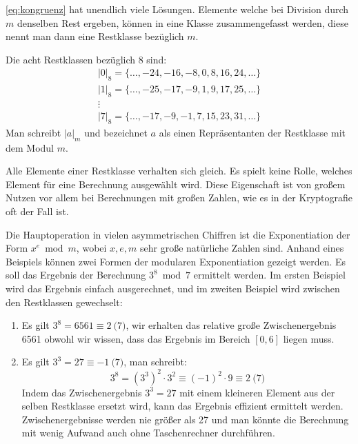 \noindent
\autoref{eq:kongruenz} hat unendlich viele Lösungen.
Elemente welche bei Division durch $m$ denselben Rest ergeben,
können in eine Klasse zusammengefasst werden, diese nennt man dann eine Restklasse bezüglich $m$.
\begin{example}
  Die acht Restklassen bezüglich 8 sind:
  \begin{gather*}
    \vert0\vert_8 = \{\dots,-24,-16,-8,0,8,16,24,\dots\}\\
    \vert1\vert_8 =\{\dots,-25,-17,-9,1,9,17,25,\dots\}\\
    \vdots\\
    \vert7\vert_8 =\{\dots,-17,-9,-1,7,15,23,31,\dots\}
  \end{gather*}
  Man schreibt $|a|_m$ und bezeichnet $a$ als einen
  Repräsentanten der Restklasse mit dem Modul $m$.
\end{example}

\noindent
Alle Elemente einer Restklasse verhalten sich gleich. Es spielt
keine Rolle, welches Element für eine Berechnung ausgewählt wird.
Diese Eigenschaft ist von großem Nutzen vor allem bei Berechnungen mit großen Zahlen,
wie es in der Kryptografie oft der Fall ist.

\begin{example}
  Die Hauptoperation in vielen asymmetrischen Chiffren ist die Exponentiation der Form
  $x^e \bmod{m}$, wobei $x,e,m$ sehr große natürliche Zahlen sind. Anhand eines Beispiels können
  zwei Formen der modularen Exponentiation gezeigt werden. Es soll das Ergebnis der
  Berechnung $3^8 \bmod{7}$ ermittelt werden. Im ersten Beispiel wird das Ergebnis einfach
  ausgerechnet, und im zweiten Beispiel wird zwischen den Restklassen gewechselt:
  \begin{enumerate}
    \item Es gilt $3^8 = 6561 \equiv 2 \pod{7}$, wir erhalten das relative
          große Zwischenergebnis 6561 obwohl wir wissen,
          dass das Ergebnis im Bereich $[0, 6]$ liegen muss.
    \item Es gilt $3^3 = 27 \equiv -1 \pod{7}$, man schreibt:
          \begin{equation*}
            3^8 = (3^3)^2 \cdot 3^2 \equiv (-1)^2 \cdot 9 \equiv 2 \pod{7}
          \end{equation*}
          Indem das Zwischenergebnis $3^3 = 27$ mit einem kleineren Element aus der selben
          Restklasse ersetzt wird, kann das Ergebnis effizient ermittelt werden. Zwischenergebnisse
          werden nie größer als 27 und man könnte die Berechnung mit wenig Aufwand auch ohne
          Taschenrechner durchführen. \qedhere
  \end{enumerate}
\end{example}

